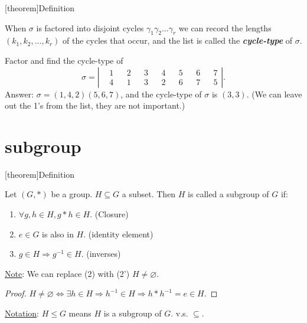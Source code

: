 \documentclass[12pt]{report}
\theoremstyle{definition}
\begin{document}
[theorem]{Definition}
\begin{cycle-type}
    When $\sigma$ is factored into disjoint cycles $\gamma_1\gamma_2\ldots\gamma_r$
    we can record the lengths $(k_1, k_2,\ldots, k_r)$ of the cycles that occur,
    and the list is called the \textbf{\emph{cycle-type}} of $\sigma$.
\end{cycle-type}

\begin{ex}
    Factor and find the cycle-type of\[
        \sigma = 
        \left|\begin{align*}
            & 1 && 2 && 3 && 4 && 5 && 6 && 7 \\
            & 4 && 1 && 3 && 2 && 6 && 7 && 5
        \end{align*}\right|.
    \]
    Answer: $\sigma = (1, 4, 2)(5, 6, 7)$, and the cycle-type of $\sigma$ is $(3, 3)$.
    (We can leave out the 1's from the list, they are not important.)
\end{ex}

\section{subgroup}

[theorem]{Definition}
\begin{subgroup}
    Let $(G, *)$ be a group. $H \subseteq G$ a subset. Then $H$ is called a subgroup of $G$ if:
    \begin{enumerate}
        \item $\forall g, h \in H, g * h \in H$. (Closure)
        \item $e \in G$ is also in $H$. (identity element)
        \item $g \in H \Rightarrow{}g^{-1} \in H$. (inverses)
    \end{enumerate}
\end{subgroup}

\underline{Note}: We can replace (2) with (2') $H \neq \varnothing$.

\begin{proof}
    $H \neq \varnothing \iff \exists h \in H \Rightarrow{} h^{-1} \in H
    \Rightarrow{} h * h^{-1} = e \in H$.
\end{proof}

\underline{Notation}: $H \le G$ means $H$ is a subgroup of $G$.
v.s. $\subseteq$.
\end{document}
